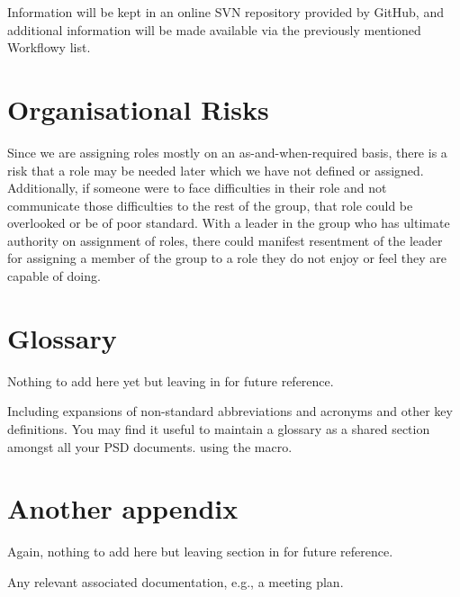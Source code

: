 \documentclass{l3deliverable}
\begin{document}
Information will be kept in an online SVN repository provided by GitHub, and 
additional information will be made available via the previously mentioned 
Workflowy list.


\section{Organisational Risks}

Since we are assigning roles mostly on an as-and-when-required basis, there is
a risk that a role may be needed later which we have not defined or assigned.
Additionally, if someone were to face difficulties in their role and not communicate
those difficulties to the rest of the group, that role could be overlooked or be
of poor standard.
With a leader in the group who has ultimate authority on assignment of roles,
there could manifest resentment of the leader for assigning a member of the group
to a role they do not enjoy or feel they are capable of doing.


\appendix

\section{Glossary}

Nothing to add here yet but leaving in for future reference.

Including expansions of non-standard abbreviations and acronyms and
other key definitions.  You may find it useful to maintain a glossary
as a shared section amongst all your PSD documents. using the
\verb!! macro.

\section{Another appendix}

Again, nothing to add here but leaving section in for future reference.

Any relevant associated documentation, e.g., a meeting plan.
\end{document}
